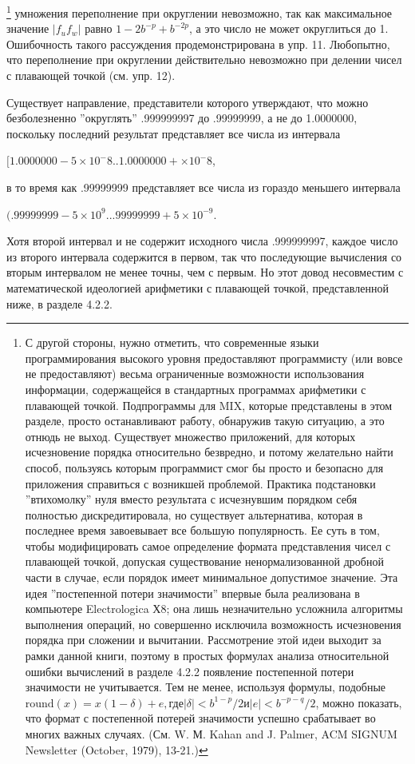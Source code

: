 {\begin{enumerate}
\footnote{С другой стороны, нужно отметить, что современные языки программирования высокого уровня предоставляют программисту (или вовсе не предоставляют) весьма ограниченные возможности использования информации, содержащейся в стандартных программах арифметики с плавающей точкой. Подпрограммы для MIX, которые представлены в этом разделе, просто останавливают работу, обнаружив такую ситуацию, а это отнюдь не выход. Существует множество приложений, для которых исчезновение порядка относительно безвредно, и потому желательно найти способ, пользуясь которым программист смог бы просто и безопасно для приложения справиться с возникшей проблемой. Практика подстановки ''втихомолку'' нуля вместо результата с исчезнувшим порядком себя полностью дискредитировала, но существует альтернатива, которая в последнее время завоевывает все большую популярность. Ее суть в том, чтобы модифицировать самое определение формата представления чисел с плавающей точкой, допуская существование ненормализованной дробной части в случае, если порядок имеет минимальное допустимое значение. Эта идея ''постепенной потери значимости'' впервые была реализована в компьютере Electrologica Х8; она лишь незначительно усложнила алгоритмы выполнения операций, но совершенно исключила возможность исчезновения порядка при сложении и вычитании. Рассмотрение этой идеи выходит за рамки данной книги, поэтому в простых формулах анализа относительной ошибки вычислений в разделе 4.2.2 появление постепенной потери значимости не учитывается. Тем не менее, используя формулы, подобные $\text{round}(x)= x(1 - \delta) + e, \text{где} |\delta | < b^{1-p}/2 \text{и} |e| < b^{-p-q}/2$, можно показать, что формат с постепенной потерей значимости успешно срабатывает во многих важных случаях. (См. W. М. Kahan and J. Palmer, ACM SIGNUM Newsletter (October, 1979), 13-21.)}
умножения переполнение при округлении невозможно, так как максимальное значение $|f_{u}f_{w}|$ равно $1- 2b^{-p} + b^{-2p}$, а это число не может округлиться до 1. Ошибочность такого рассуждения продемонстрирована в упр. 11. Любопытно, что переполнение при округлении действительно невозможно при делении чисел с плавающей точкой (см. упр. 12).

Существует направление, представители которого утверждают, что можно безболезненно ''округлять'' .999999997 до .99999999, а не до 1.0000000, поскольку последний результат представляет все числа из интервала
\begin{center}
$[1.0000000 - 5 \times 10^-8 .. 1.0000000 + \times 10^-8$,
\end{center}
в то время как .99999999 представляет все числа из гораздо меньшего интервала
\begin{center} 
$(.99999999 - 5 \times 10^{9} .. .99999999 + 5 \times 10^{-9}$.
\end{center}
Хотя второй интервал и не содержит исходного числа .999999997, каждое число из второго интервала содержится в первом, так что последующие вычисления со вторым интервалом не менее точны, чем с первым. Но этот довод несовместим с математической идеологией арифметики с плавающей точкой, представленной ниже, в разделе 4.2.2.
 

\end{enumerate}}
